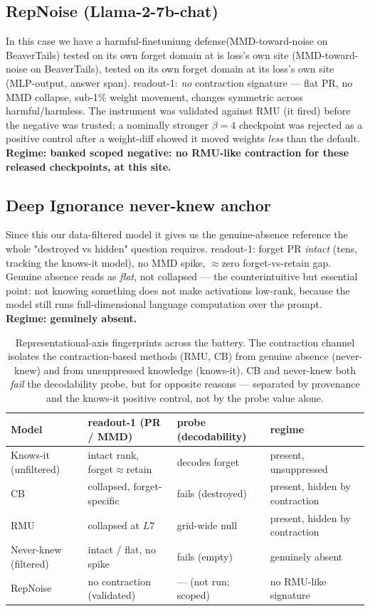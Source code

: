 \documentclass[11pt]{article}
\newcommand{\PR}{\mathrm{PR}}
\begin{document}
\subsection{RepNoise (Llama-2-7b-chat)}
In this case we have a harmful-finetuniung defense(MMD-toward-noise on BeaverTails) tested on its own forget domain at is loss's own site  (MMD-toward-noise on BeaverTails), tested on its own forget
domain at its loss's own site (MLP-output, answer span). readout-1: \emph{no} contraction
signature --- flat PR, no MMD collapse, sub-1\% weight movement, changes symmetric across
harmful/harmless. The instrument was validated against RMU (it fired) before the negative
was trusted; a nominally stronger $\beta{=}4$ checkpoint was rejected as a positive control
after a weight-diff showed it moved weights \emph{less} than the default. \textbf{Regime:
banked scoped negative: no RMU-like contraction for these released checkpoints, at this
site.}

\subsection{Deep Ignorance never-knew anchor}
Since this our data-filtered model it gives us the genuine-absence reference the whole "destroyed vs hidden" question requires.  readout-1: forget $\PR$ \emph{intact} (tens, tracking the knows-it
model), no MMD spike, $\approx$zero forget-vs-retain gap. Genuine absence reads as
\emph{flat}, not collapsed --- the counterintuitive but essential point: not knowing
something does not make activations low-rank, because the model still runs full-dimensional
language computation over the prompt. \textbf{Regime: genuinely absent.}

\begin{table}[h]
\centering
\small
\begin{tabular}{llll}
\toprule
Model & readout-1 (PR / MMD) & probe (decodability) & regime \\
\midrule
Knows-it (unfiltered) & intact rank, forget$\approx$retain & decodes forget & present, unsuppressed \\
CB & collapsed, forget-specific & fails (destroyed) & present, hidden by contraction \\
RMU & collapsed at $L7$ & grid-wide null & present, hidden by contraction \\
Never-knew (filtered) & intact / flat, no spike & fails (empty) & genuinely absent \\
RepNoise & no contraction (validated) & --- (not run; scoped) & no RMU-like signature \\
\bottomrule
\end{tabular}
\caption{Representational-axis fingerprints across the battery. The contraction channel
isolates the contraction-based methods (RMU, CB) from genuine absence (never-knew) and from
unsuppressed knowledge (knows-it). CB and never-knew both \emph{fail} the decodability
probe, but for opposite reasons --- separated by provenance and the knows-it positive
control, not by the probe value alone.}
\label{tab:consolidated}
\end{table}
\end{document}
